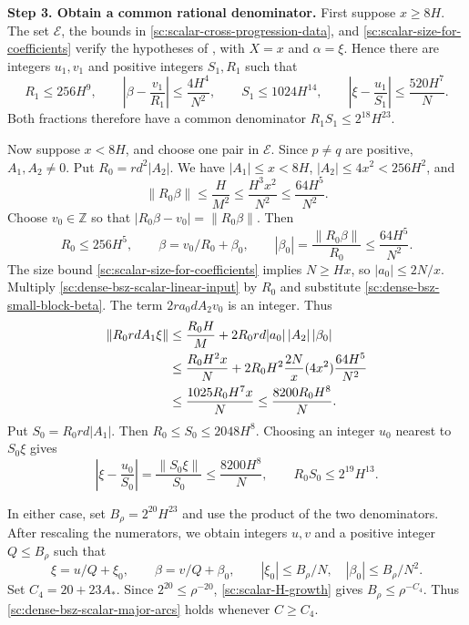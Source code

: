\documentclass[twoside]{aomart}
\makeatletter
\theoremstyle{paperplain}
\theoremstyle{paperdefinition}
\renewenvironment{proof}[1][\proofname]{\par\pushQED{\qed}%
  \normalfont\topsep6\p@\@plus3\p@\relax\trivlist
  \item[\hskip\labelsep\itshape #1\@addpunct{.}]\ignorespaces
}{\popQED\endtrivlist\@endpefalse}
\numberwithin{equation}{section}
\makeatother
\begin{document}
\begin{proof}
\par
\medskip
\noindent\textbf{Step 3. Obtain a common rational denominator.}
First suppose $x\ge8H$. The set $\mathcal E$, the bounds in
\eqref{sc:scalar-cross-progression-data}, and
\eqref{sc:scalar-size-for-coefficients} verify the hypotheses of
, with $X=x$ and $\alpha=\xi$.
Hence there are integers $u_1,v_1$ and positive integers $S_1,R_1$
such that
\begin{equation*}
 R_1\le256H^9,\qquad \left|\beta-\frac{v_1}{R_1}\right|\le\frac{4H^4}{N^2},\qquad S_1\le1024H^{14},\qquad \left|\xi-\frac{u_1}{S_1}\right|\le\frac{520H^7}{N}.
\end{equation*}
Both fractions therefore have a common denominator
$R_1S_1\le2^{18}H^{23}$.

Now suppose $x<8H$, and choose one pair in $\mathcal E$.
Since $p\ne q$ are positive, $A_1,A_2\ne0$. Put
$R_0=rd^2|A_2|$. We have $|A_1|\le x<8H$,
$|A_2|\le4x^2<256H^2$, and
\begin{equation*}
 \|R_0\beta\|\le\frac{H}{M^2}
 \le\frac{H^3x^2}{N^2}\le\frac{64H^5}{N^2}.
\end{equation*}
Choose $v_0\in\mathbb Z$ so that $|R_0\beta-v_0|=\|R_0\beta\|$. Then
\begin{equation}
 R_0\le256H^5,\qquad
 \beta=v_0/R_0+\beta_0,\qquad
 |\beta_0|=\frac{\|R_0\beta\|}{R_0}\le\frac{64H^5}{N^2}.
 \label{sc:dense-bsz-small-block-beta}
\end{equation}
The size bound \eqref{sc:scalar-size-for-coefficients} implies
$N\ge Hx$, so $|a_0|\le2N/x$.
Multiply \eqref{sc:dense-bsz-scalar-linear-input} by $R_0$ and
substitute \eqref{sc:dense-bsz-small-block-beta}.
The term $2ra_0dA_2v_0$ is an integer. Thus
\begin{align*}
 \|R_0rdA_1\xi\|
 &\le \frac{R_0H}{M}+2R_0rd|a_0|\,|A_2|\,|\beta_0|\notag\\
 &\le \frac{R_0H^2x}{N}
       +2R_0H^2\frac{2N}{x}(4x^2)\frac{64H^5}{N^2}\notag\\
 &\le\frac{1025R_0H^7x}{N}
 \le\frac{8200R_0H^8}{N}.
\end{align*}
Put $S_0=R_0rd|A_1|$. Then
$R_0\le S_0\le2048H^8$. Choosing an integer $u_0$ nearest to
$S_0\xi$ gives
\begin{equation*}
 \left|\xi-\frac{u_0}{S_0}\right|
 =\frac{\|S_0\xi\|}{S_0}
 \le\frac{8200H^8}{N},\qquad
 R_0S_0\le2^{19}H^{13}.
\end{equation*}

In either case, set $B_\rho=2^{20}H^{23}$ and use the product of
the two denominators. After rescaling the numerators, we obtain
integers $u,v$ and a positive integer $Q\le B_\rho$ such that
\begin{equation*}
 \xi=u/Q+\xi_0,\qquad \beta=v/Q+\beta_0,\qquad
 |\xi_0|\le B_\rho/N,\quad |\beta_0|\le B_\rho/N^2.
\end{equation*}
Set $C_4=20+23A_*$. Since $2^{20}\le\rho^{-20}$,
\eqref{sc:scalar-H-growth} gives $B_\rho\le\rho^{-C_4}$.
Thus \eqref{sc:dense-bsz-scalar-major-arcs} holds whenever $C\ge C_4$.


\end{proof}
\end{document}
